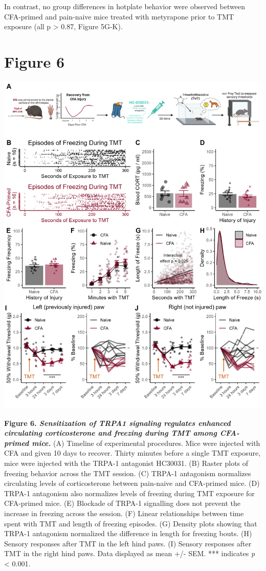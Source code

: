 \documentclass[
]{book}
\begin{document}
In contrast, no group differences in hotplate behavior were observed between CFA-primed and pain-naive mice treated with metyrapone prior to TMT exposure (all p \textgreater{} 0.87, Figure 5G-K).

\chapter*{Figure 6}\label{figure-6}

\includegraphics[width=31.25in]{Figs/6_HC30031_panel}

\textbf{Figure 6. \emph{Sensitization of TRPA1 signaling regulates enhanced circulating corticosterone and freezing during TMT among CFA-primed mice.}} (A) Timeline of experimental procedures. Mice were injected with CFA and given 10 days to recover. Thirty minutes before a single TMT exposure, mice were injected with the TRPA-1 antagonist HC30031. (B) Raster plots of freezing behavior across the TMT session. (C) TRPA-1 antagonism normalizes circulating levels of corticosterone between pain-naive and CFA-primed mice. (D) TRPA-1 antagonism also normalizes levels of freezing during TMT exposure for CFA-primed mice. (E) Blockade of TRPA-1 signalling does not prevent the increase in freezing across the session. (F) Linear relationships between time spent with TMT and length of freezing episodes. (G) Density plots showing that TRPA-1 antagonism normalized the difference in length for freezing bouts. (H) Sensory responses after TMT in the left hind paws. (I) Sensory responses after TMT in the right hind paws. Data displayed as mean +/- SEM. *** indicates \emph{p} \textless{} 0.001.
\end{document}
